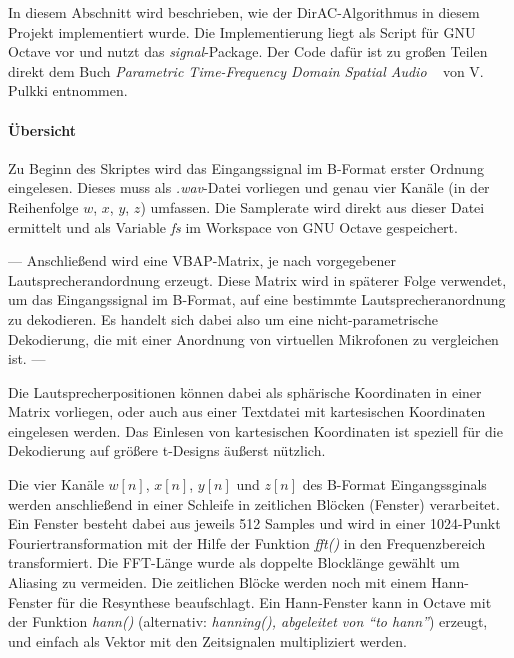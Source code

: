 In diesem Abschnitt wird beschrieben, wie der DirAC-Algorithmus in diesem Projekt implementiert wurde. Die Implementierung liegt als Script für GNU Octave vor und nutzt das \textit{signal}-Package. Der Code dafür ist zu großen Teilen direkt dem Buch \textit{Parametric Time-Frequency Domain Spatial Audio} ~\cite{spatial-book} von V. Pulkki entnommen.

\paragraph{Übersicht}
Zu Beginn des Skriptes wird das Eingangssignal im B-Format erster Ordnung eingelesen. Dieses muss als \textit{.wav}-Datei vorliegen und genau vier Kanäle (in der Reihenfolge $w$, $x$, $y$, $z$) umfassen. Die Samplerate wird direkt aus dieser Datei ermittelt und als Variable \textit{fs} im Workspace von GNU Octave gespeichert.

---
Anschließend wird eine VBAP-Matrix, je nach vorgegebener Lautsprecherandordnung erzeugt. Diese Matrix wird in späterer Folge verwendet, um das Eingangssignal im B-Format, auf eine bestimmte Lautsprecheranordnung zu dekodieren. Es handelt sich dabei also um eine nicht-parametrische Dekodierung, die mit einer Anordnung von virtuellen Mikrofonen zu vergleichen ist.
---

Die Lautsprecherpositionen können dabei als sphärische Koordinaten in einer Matrix vorliegen, oder auch aus einer Textdatei mit kartesischen Koordinaten eingelesen werden. Das Einlesen von kartesischen Koordinaten ist speziell für die Dekodierung auf größere t-Designs äußerst nützlich.

Die vier Kanäle $w[n]$, $x[n]$, $y[n]$ und $z[n]$ des B-Format Eingangssginals werden anschließend in einer Schleife in zeitlichen Blöcken (Fenster) verarbeitet. Ein Fenster besteht dabei aus jeweils 512 Samples und wird in einer 1024-Punkt Fouriertransformation mit der Hilfe der Funktion \textit{fft()} in den Frequenzbereich transformiert. Die FFT-Länge wurde als doppelte Blocklänge gewählt um Aliasing zu vermeiden. Die zeitlichen Blöcke werden noch mit einem Hann-Fenster für die Resynthese beaufschlagt. Ein Hann-Fenster kann in Octave mit der Funktion \textit{hann()} (alternativ: \textit{hanning(), abgeleitet von ``to hann''}) erzeugt, und einfach als Vektor mit den Zeitsignalen multipliziert werden.
